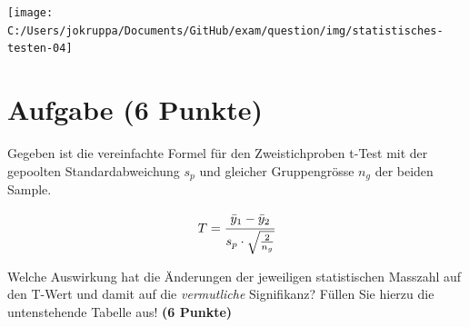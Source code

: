 \documentclass[a4paper, 10pt]{scrartcl}\usepackage[]{graphicx}\usepackage[]{color}
\begin{document}
\begin{center}
  \texttt{[image: C:/Users/jokruppa/Documents/GitHub/exam/question/img/statistisches-testen-04]}
\end{center}


 
\clearpage

\section{Aufgabe \hfill (6 Punkte)}

Gegeben ist die vereinfachte Formel f{\"u}r den Zweistichproben t-Test mit der
gepoolten Standardabweichung $s_p$ und gleicher Gruppengr{\"o}sse $n_g$ der
beiden Sample.

\begin{equation*}
  \label{eq:1}
  T = \cfrac{\bar{y}_1 - \bar{y}_2}{s_p \cdot \sqrt{\tfrac{2}{n_g}}}
\end{equation*}

Welche Auswirkung hat die {\"A}nderungen der jeweiligen statistischen Masszahl
auf den T-Wert und damit auf die \textit{vermutliche} Signifikanz? F{\"u}llen
Sie hierzu die untenstehende Tabelle aus! \textbf{(6 Punkte)}
\end{document}
